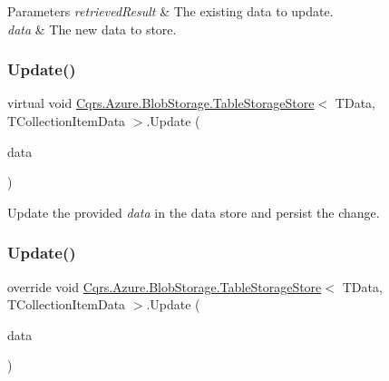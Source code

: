 \begin{DoxyParams}{Parameters}
{\em retrieved\+Result} & The existing data to update.\\
\hline
{\em data} & The new data to store.\\
\hline
\end{DoxyParams}
\mbox{\label{classCqrs_1_1Azure_1_1BlobStorage_1_1TableStorageStore_aacb673aed5c6f828917f4d2e8c2ff75b_aacb673aed5c6f828917f4d2e8c2ff75b}} 
\subsubsection{\texorpdfstring{Update()}{Update()}\hspace{0.1cm}{\footnotesize\ttfamily [1/2]}}
{\footnotesize\ttfamily virtual void \hyperlink{classCqrs_1_1Azure_1_1BlobStorage_1_1TableStorageStore}{Cqrs.\+Azure.\+Blob\+Storage.\+Table\+Storage\+Store}$<$ T\+Data, T\+Collection\+Item\+Data $>$.Update (\begin{DoxyParamCaption}\item[{T\+Collection\+Item\+Data}]{data }\end{DoxyParamCaption})\hspace{0.3cm}{\ttfamily [virtual]}}



Update the provided {\itshape data}  in the data store and persist the change. 

\mbox{\label{classCqrs_1_1Azure_1_1BlobStorage_1_1TableStorageStore_a869eba77358b10fc298f8e13fb21d628_a869eba77358b10fc298f8e13fb21d628}} 
\subsubsection{\texorpdfstring{Update()}{Update()}\hspace{0.1cm}{\footnotesize\ttfamily [2/2]}}
{\footnotesize\ttfamily override void \hyperlink{classCqrs_1_1Azure_1_1BlobStorage_1_1TableStorageStore}{Cqrs.\+Azure.\+Blob\+Storage.\+Table\+Storage\+Store}$<$ T\+Data, T\+Collection\+Item\+Data $>$.Update (\begin{DoxyParamCaption}\item[{T\+Data}]{data }\end{DoxyParamCaption})\hspace{0.3cm}{\ttfamily [virtual]}}



